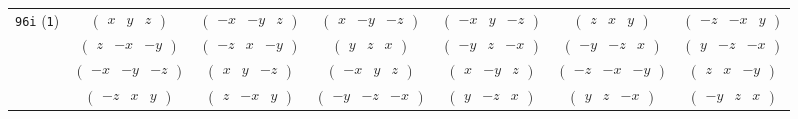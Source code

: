 \documentclass[fleqn,9pt,landscape]{jsarticle}
\begin{document}
\begin{center}
\begin{longtable}{ccccccc}
{\tt 96i} ({\tt 1}) & $ \begin{pmatrix} x & y & z \end{pmatrix} $ & $ \begin{pmatrix} - x & - y & z \end{pmatrix} $ & $ \begin{pmatrix} x & - y & - z \end{pmatrix} $ & $ \begin{pmatrix} - x & y & - z \end{pmatrix} $ & $ \begin{pmatrix} z & x & y \end{pmatrix} $ & $ \begin{pmatrix} - z & - x & y \end{pmatrix} $ \\
& $ \begin{pmatrix} z & - x & - y \end{pmatrix} $ & $ \begin{pmatrix} - z & x & - y \end{pmatrix} $ & $ \begin{pmatrix} y & z & x \end{pmatrix} $ & $ \begin{pmatrix} - y & z & - x \end{pmatrix} $ & $ \begin{pmatrix} - y & - z & x \end{pmatrix} $ & $ \begin{pmatrix} y & - z & - x \end{pmatrix} $ \\
& $ \begin{pmatrix} - x & - y & - z \end{pmatrix} $ & $ \begin{pmatrix} x & y & - z \end{pmatrix} $ & $ \begin{pmatrix} - x & y & z \end{pmatrix} $ & $ \begin{pmatrix} x & - y & z \end{pmatrix} $ & $ \begin{pmatrix} - z & - x & - y \end{pmatrix} $ & $ \begin{pmatrix} z & x & - y \end{pmatrix} $ \\
& $ \begin{pmatrix} - z & x & y \end{pmatrix} $ & $ \begin{pmatrix} z & - x & y \end{pmatrix} $ & $ \begin{pmatrix} - y & - z & - x \end{pmatrix} $ & $ \begin{pmatrix} y & - z & x \end{pmatrix} $ & $ \begin{pmatrix} y & z & - x \end{pmatrix} $ & $ \begin{pmatrix} - y & z & x \end{pmatrix} $ \\

\end{longtable}
\end{center}
\end{document}

